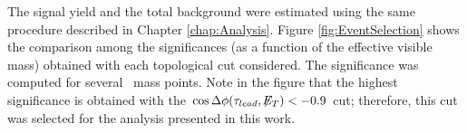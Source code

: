 \noindent The signal yield and the total background were estimated using 
the same procedure described in Chapter \ref{chap:Analysis}. Figure \ref{fig:EventSelection} shows 
the comparison among the significances (as a function of the 
effective visible mass) obtained with each topological cut 
considered. The significance was computed for several \Zprime~mass points. Note 
in the figure that the highest significance is obtained with 
the $\cos\Delta \phi (\tau_{lead},\not\!\!E_T) < -0.9$ cut; therefore, 
this cut was selected for the analysis presented in this work.

\begin{figure}[ht]
\begin{center}
\captionsetup[subfloat]{farskip=0pt,captionskip=0.0cm,labelformat=empty}
\end{center}
\end{figure}
